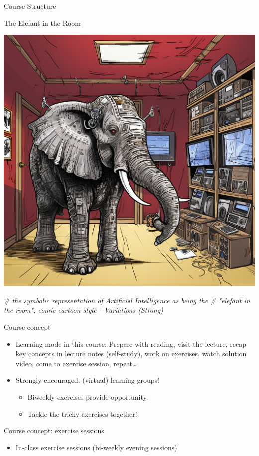 \documentclass[
  ignorenonframetext,
]{beamer}
\newenvironment{Shaded}{\begin{snugshade}}{\end{snugshade}}
\newcommand{\CommentTok}[1]{\textcolor[rgb]{0.56,0.35,0.01}{\textit{#1}}}
\providecommand{\tightlist}{%
  \setlength{\itemsep}{0pt}\setlength{\parskip}{0pt}}
\begin{document}
\begin{frame}[fragile]{Course Structure}
\begin{block}{The Elefant in the Room}
\protect\hypertarget{the-elefant-in-the-room}{}
\begin{center}\includegraphics[width=0.4\linewidth]{../../img/ElefantInTheRoom} \end{center}

\begin{Shaded}
\begin{Highlighting}[]
\CommentTok{\# the symbolic representation of Artificial Intelligence as being the }
\CommentTok{\# "elefant in the room", comic cartoon style {-} Variations (Strong) }
\end{Highlighting}
\end{Shaded}
\end{block}

\begin{block}{Course concept}
\protect\hypertarget{course-concept}{}
\begin{itemize}
\item
  Learning mode in this course: Prepare with reading, visit the lecture,
  recap key concepts in lecture notes (self-study), work on exercises,
  watch solution video, come to exercise session, repeat\ldots{}
\item
  Strongly encouraged: (virtual) learning groups!

  \begin{itemize}
  \tightlist
  \item
    Biweekly exercises provide opportunity.
  \item
    Tackle the tricky exercises together!
  \end{itemize}
\end{itemize}
\end{block}

\begin{block}{Course concept: exercise sessions}
\protect\hypertarget{course-concept-exercise-sessions}{}
\begin{itemize}
\tightlist
\item
  In-class exercise sessions (bi-weekly evening sessions)


\end{itemize}
\end{block}
\end{frame}
\end{document}
